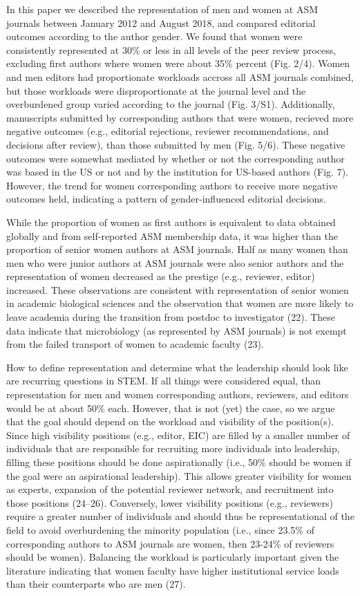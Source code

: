 \documentclass[11pt,]{article}
\begin{document}
In this paper we described the representation of men and women at ASM
journals between January 2012 and August 2018, and compared editorial
outcomes according to the author gender. We found that women were
consistently represented at 30\% or less in all levels of the peer
review process, excluding first authors where women were about 35\%
percent (Fig. 2/4). Women and men editors had proportionate workloads
accross all ASM journals combined, but those workloads were
disproportionate at the journal level and the overburdened group varied
according to the journal (Fig. 3/S1). Additionally, manuscripts
submitted by corresponding authors that were women, recieved more
negative outcomes (e.g., editorial rejections, reviewer recommendations,
and decisions after review), than those submitted by men (Fig. 5/6).
These negative outcomes were somewhat mediated by whether or not the
corresponding author was based in the US or not and by the institution
for US-based authors (Fig. 7). However, the trend for women
corresponding authors to receive more negative outcomes held, indicating
a pattern of gender-influenced editorial decisions.

While the proportion of women as first authors is equivalent to data
obtained globally and from self-reported ASM membership data, it was
higher than the proportion of senior women authors at ASM journals. Half
as many women than men who were junior authors at ASM journals were also
senior authors and the representation of women decreased as the prestige
(e.g., reviewer, editor) increased. These observations are consistent
with representation of senior women in academic biological sciences and
the observation that women are more likely to leave academia during the
transition from postdoc to investigator (22). These data indicate that
microbiology (as represented by ASM journals) is not exempt from the
failed transport of women to academic faculty (23).

How to define representation and determine what the leadership should
look like are recurring questions in STEM. If all things were considered
equal, than representation for men and women corresponding authors,
reviewers, and editors would be at about 50\% each. However, that is not
(yet) the case, so we argue that the goal should depend on the workload
and visibility of the position(s). Since high visibility positions
(e.g., editor, EIC) are filled by a smaller number of individuals that
are responsible for recruiting more individuals into leadership, filling
these positions should be done aspirationally (i.e., 50\% should be
women if the goal were an aspirational leadership). This allows greater
visibility for women as experts, expansion of the potential reviewer
network, and recruitment into those positions (24--26). Conversely,
lower visibility positions (e.g., reviewers) require a greater number of
individuals and should thus be representational of the field to avoid
overburdening the minority population (i.e., since 23.5\% of
corresponding authors to ASM journals are women, then 23-24\% of
reviewers should be women). Balancing the workload is particularly
important given the literature indicating that women faculty have higher
institutional service loads than their counterparts who are men (27).
\end{document}
